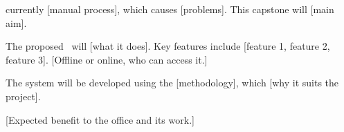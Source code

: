 \clearpage
\begin{center}\bfseries\CapstoneTitle\end{center}
\noindent[Office] currently [manual process], which causes [problems]. This capstone will [main aim].

The proposed \SystemName\ will [what it does]. Key features include [feature 1, feature 2, feature 3]. [Offline or online, who can access it.]

The system will be developed using the [methodology], which [why it suits the project].

[Expected benefit to the office and its work.]
